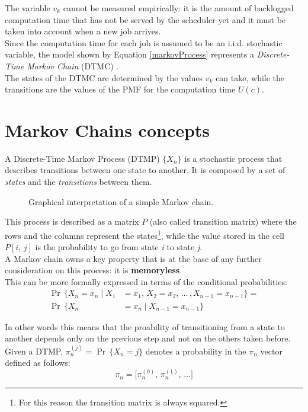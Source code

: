 The variable \( v_{k} \) cannot be measured empirically: it is the amount of backlogged computation time that has not be served by the scheduler yet and it must be taken into account when a new job arrives.\\
Since the computation time for each job is assumed to be an i.i.d. stochastic variable, the model shown by Equation \ref{markovProcess} represents a \emph{Discrete-Time Markov Chain} (DTMC) \cite{effRobustGuarantees} \cite{probGuarantees}.\\
The states of the DTMC are determined by the values \( v_{k} \) can take, while the transitions are the values of the PMF for the computation time \( U(c) \).

\section{Markov Chains concepts}
A Discrete-Time Markov Process (DTMP) \( \{X_{n}\} \) is a stochastic process that describes transitions between one state to another. It is composed by a set of \emph{states} and the \emph{transitions} between them.
\begin{figure}[H]
  \caption{Graphical interpretation of a simple Markov chain.}
  \label{automaton}
\end{figure}

This process is described as a matrix \( P \) (also called transition matrix) where the rows and the columns represent the states\footnote{For this reason the transition matrix is always squared.}, while the value stored in the cell \( P[i,\,j] \) is the probability to go from state \emph{i} to state \emph{j}.\\
A Markov chain owns a key property that is at the base of any further consideration on this process: it is \textbf{memoryless}.\\
This can be more formally expressed in terms of the conditional probabilities:
\begin{equation} \tag{3} \label{memoryless}
\begin{split}
  \Pr\,\{X_{n} = x_{n} \mid X_{1} &= x_{1},\,X_{2} = x_{2},\,\dots\,, X_{n-1} = x_{n-1} \} =\\
  \Pr\,\{X_{n} &= x_{n} \mid X_{n-1} = x_{n-1}  \}
\end{split}
\end{equation}

In other words this means that the proability of transitioning from a state to another depends only on the previous step and not on the others taken before.\\
Given a DTMP, \( \pi_{n}^{(j)} = \Pr\,\{X_{n} = j\}\) denotes a probability in the \( \pi_{n} \) vector defined as follows:
\begin{equation*}
  \pi_{n} =  \big[\pi_{n}^{(0)},\,\pi_{n}^{(1)},\,\dots \big]
\end{equation*}

